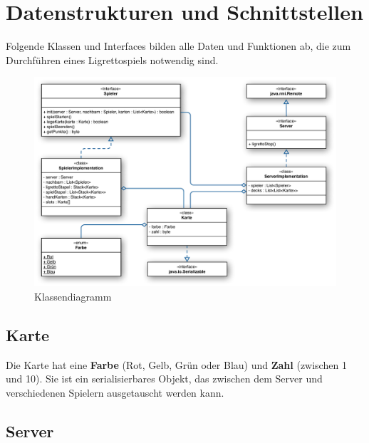 \section{Datenstrukturen und Schnittstellen} 

Folgende Klassen und Interfaces bilden alle Daten und Funktionen ab, die zum Durchführen eines Ligrettospiels notwendig sind.



\begin{figure}[H]
	\includegraphics[width=1.0\textwidth,angle=0]{graphics/klassendiagramm.pdf}
	\caption{Klassendiagramm \hfill{} }
\end{figure}


\subsection{Karte}

Die Karte hat eine {\bf Farbe} (Rot, Gelb, Grün oder Blau) und {\bf Zahl} (zwischen 1 und 10). Sie ist ein serialisierbares Objekt, das zwischen dem Server und verschiedenen Spielern ausgetauscht werden kann.




\subsection{Server}

